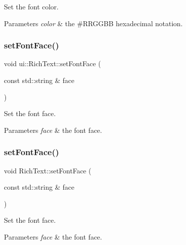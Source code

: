 Set the font color. 
\begin{DoxyParams}{Parameters}
{\em color} & the \#\+R\+R\+G\+G\+BB hexadecimal notation. \\
\hline
\end{DoxyParams}
\mbox{\label{classui_1_1RichText_aece9d280930f5c88b721838dc414f6e9}} 
\subsubsection{\texorpdfstring{set\+Font\+Face()}{setFontFace()}\hspace{0.1cm}{\footnotesize\ttfamily [1/2]}}
{\footnotesize\ttfamily void ui\+::\+Rich\+Text\+::set\+Font\+Face (\begin{DoxyParamCaption}\item[{const std\+::string \&}]{face }\end{DoxyParamCaption})}

Set the font face. 
\begin{DoxyParams}{Parameters}
{\em face} & the font face. \\
\hline
\end{DoxyParams}
\mbox{\label{classui_1_1RichText_a9ea95bec970e9f1c03ba0bf34c11b93d}} 
\subsubsection{\texorpdfstring{set\+Font\+Face()}{setFontFace()}\hspace{0.1cm}{\footnotesize\ttfamily [2/2]}}
{\footnotesize\ttfamily void Rich\+Text\+::set\+Font\+Face (\begin{DoxyParamCaption}\item[{const std\+::string \&}]{face }\end{DoxyParamCaption})}

Set the font face. 
\begin{DoxyParams}{Parameters}
{\em face} & the font face. \\
\hline
\end{DoxyParams}
\mbox{\label{classui_1_1RichText_a45a5d5e1f075648230019b8d1400df87}} 
